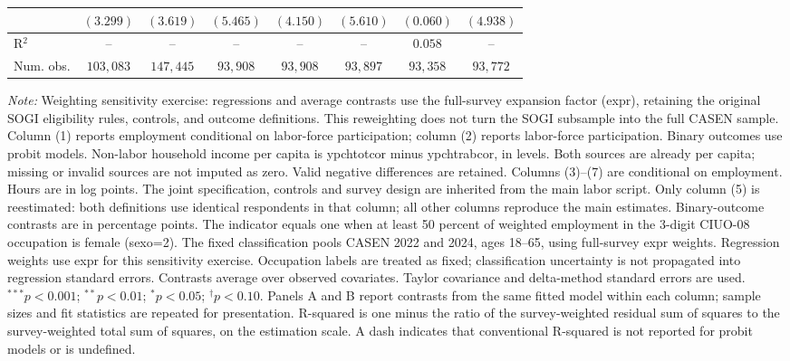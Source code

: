 \begin{table}[htpb!]
{\begin{tabular}{l c c c c c c c}
 & $(3.299)$ & $(3.619)$ & $(5.465)$ & $(4.150)$ & $(5.610)$ & $(0.060)$ & $(4.938)$ \\
\hline
R$^2$ & -- & -- & -- & -- & -- & $0.058$ & -- \\
Num. obs. & $103,083$ & $147,445$ & $93,908$ & $93,908$ & $93,897$ & $93,358$ & $93,772$ \\
\hline
\end{tabular}%
}
\par\vspace{1ex}
\begin{minipage}{\textwidth}\footnotesize\raggedright
\textit{Note:} Weighting sensitivity exercise: regressions and average contrasts use the full-survey expansion factor (expr), retaining the original SOGI eligibility rules, controls, and outcome definitions. This reweighting does not turn the SOGI subsample into the full CASEN sample. Column (1) reports employment conditional on labor-force participation; column (2) reports labor-force participation. Binary outcomes use probit models. Non-labor household income per capita is ypchtotcor minus ypchtrabcor, in levels. Both sources are already per capita; missing or invalid sources are not imputed as zero. Valid negative differences are retained.  Columns (3)--(7) are conditional on employment. Hours are in log points. The joint specification, controls and survey design are inherited from the main labor script. Only column (5) is reestimated: both definitions use identical respondents in that column; all other columns reproduce the main estimates. Binary-outcome contrasts are in percentage points. The indicator equals one when at least 50 percent of weighted employment in the 3-digit CIUO-08 occupation is female (sexo=2). The fixed classification pools CASEN 2022 and 2024, ages 18--65, using full-survey expr weights. Regression weights use expr for this sensitivity exercise. Occupation labels are treated as fixed; classification uncertainty is not propagated into regression standard errors. Contrasts average over observed covariates. Taylor covariance and delta-method standard errors are used. $^{***}p<0.001$; $^{**}p<0.01$; $^{*}p<0.05$; $^{\dagger}p<0.10$. Panels A and B report contrasts from the same fitted model within each column; sample sizes and fit statistics are repeated for presentation. R-squared is one minus the ratio of the survey-weighted residual sum of squares to the survey-weighted total sum of squares, on the estimation scale. A dash indicates that conventional R-squared is not reported for probit models or is undefined.
\end{minipage}
\end{table}
